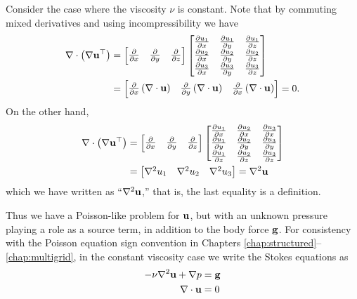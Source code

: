 Consider the case where the viscosity $\nu$ is constant.  Note that by commuting mixed derivatives and using incompressibility we have
\begin{align*}
\nabla\cdot \left(\nabla \mathbf{u}^{\top}\right) &= \begin{bmatrix}
    \frac{\partial}{\partial x} & \frac{\partial}{\partial y} & \frac{\partial}{\partial z}
    \end{bmatrix}
    \begin{bmatrix}
    \frac{\partial u_1}{\partial x} & \frac{\partial u_1}{\partial y} & \frac{\partial u_1}{\partial z} \\
    \frac{\partial u_2}{\partial x} & \frac{\partial u_2}{\partial y} & \frac{\partial u_2}{\partial z} \\
    \frac{\partial u_3}{\partial x} & \frac{\partial u_3}{\partial y} & \frac{\partial u_3}{\partial z}
    \end{bmatrix} \\
  &= \begin{bmatrix}
    \frac{\partial}{\partial x}\left(\nabla\cdot \mathbf{u}\right) & \frac{\partial}{\partial y }\left(\nabla\cdot \mathbf{u}\right) & \frac{\partial}{\partial x} \left(\nabla\cdot \mathbf{u}\right)
    \end{bmatrix}
    = 0.
\end{align*}
On the other hand,
\begin{align*}
\nabla\cdot \left(\nabla \mathbf{u}^{\top}\right) &= \begin{bmatrix}
    \frac{\partial}{\partial x} & \frac{\partial}{\partial y} & \frac{\partial}{\partial z}
    \end{bmatrix}
    \begin{bmatrix}
    \frac{\partial u_1}{\partial x} & \frac{\partial u_2}{\partial x} & \frac{\partial u_3}{\partial x} \\
    \frac{\partial u_1}{\partial y} & \frac{\partial u_2}{\partial y} & \frac{\partial u_3}{\partial y} \\
    \frac{\partial u_1}{\partial z} & \frac{\partial u_2}{\partial z} & \frac{\partial u_3}{\partial z}
    \end{bmatrix} \\
  &= \begin{bmatrix} \nabla^2 u_1 & \nabla^2 u_2 & \nabla^2 u_3 \end{bmatrix} = \nabla^2 \mathbf{u}
\end{align*}
which we have written as ``$\nabla^2 \mathbf{u}$,'' that is, the last equality is a definition.  

Thus we have a Poisson-like problem for $\mathbf{u}$, but with an unknown pressure playing a role as a source term, in addition to the body force $\mathbf{g}$.  For consistency with the Poisson equation sign convention in Chapters \ref{chap:structured}--\ref{chap:multigrid}, in the constant viscosity case we write the Stokes equations as
\begin{align}
- \nu \nabla^2 \mathbf{u} + \nabla p &= \mathbf{g} \\
\nabla\cdot \mathbf{u} &= 0
\end{align}

